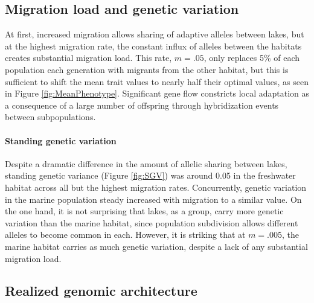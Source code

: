 \documentclass{article}
\begin{document}
\subsection*{Migration load and genetic variation}


At first, increased migration allows sharing of adaptive alleles between lakes,
but at the highest migration rate,
the constant influx of alleles between the habitats creates substantial migration load.
This rate, $m=.05$, only replaces 5\% of each population each generation
with migrants from the other habitat, but this is sufficient to shift the mean trait values
to nearly half their optimal values, as seen in Figure \ref{fig:MeanPhenotype}.
Significant gene flow constricts local adaptation
as a consequence of a large number of offspring through hybridization events between subpopulations.

\paragraph{Standing genetic variation}
Despite a dramatic difference in the amount of allelic sharing between lakes,
standing genetic variance (Figure \ref{fig:SGV}) was around 0.05 in the freshwater habitat
across all but the highest migration rates.
Concurrently,
genetic variation in the marine population steady increased with migration
to a similar value.
On the one hand, it is not surprising that lakes, as a group,
carry more genetic variation than the marine habitat,
since population subdivision allows different alleles to become common in each.
However, it is striking that at $m=.005$, the marine habitat carries as much genetic variation,
despite a lack of any substantial migration load.



\subsection*{Realized genomic architecture}
\end{document}
